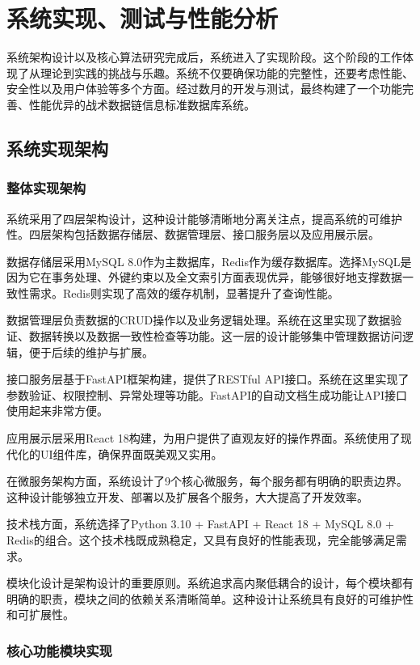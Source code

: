 \chapter{系统实现、测试与性能分析}

系统架构设计以及核心算法研究完成后，系统进入了实现阶段。这个阶段的工作体现了从理论到实践的挑战与乐趣。系统不仅要确保功能的完整性，还要考虑性能、安全性以及用户体验等多个方面。经过数月的开发与测试，最终构建了一个功能完善、性能优异的战术数据链信息标准数据库系统。

\section{系统实现架构}

\subsection{整体实现架构}

系统采用了四层架构设计，这种设计能够清晰地分离关注点，提高系统的可维护性。四层架构包括数据存储层、数据管理层、接口服务层以及应用展示层。

数据存储层采用MySQL 8.0作为主数据库，Redis作为缓存数据库。选择MySQL是因为它在事务处理、外键约束以及全文索引方面表现优异，能够很好地支撑数据一致性需求。Redis则实现了高效的缓存机制，显著提升了查询性能。

数据管理层负责数据的CRUD操作以及业务逻辑处理。系统在这里实现了数据验证、数据转换以及数据一致性检查等功能。这一层的设计能够集中管理数据访问逻辑，便于后续的维护与扩展。

接口服务层基于FastAPI框架构建，提供了RESTful API接口。系统在这里实现了参数验证、权限控制、异常处理等功能。FastAPI的自动文档生成功能让API接口使用起来非常方便。

应用展示层采用React 18构建，为用户提供了直观友好的操作界面。系统使用了现代化的UI组件库，确保界面既美观又实用。

在微服务架构方面，系统设计了9个核心微服务，每个服务都有明确的职责边界。这种设计能够独立开发、部署以及扩展各个服务，大大提高了开发效率。

技术栈方面，系统选择了Python 3.10 + FastAPI + React 18 + MySQL 8.0 + Redis的组合。这个技术栈既成熟稳定，又具有良好的性能表现，完全能够满足需求。

模块化设计是架构设计的重要原则。系统追求高内聚低耦合的设计，每个模块都有明确的职责，模块之间的依赖关系清晰简单。这种设计让系统具有良好的可维护性和可扩展性。



\subsection{核心功能模块实现}

